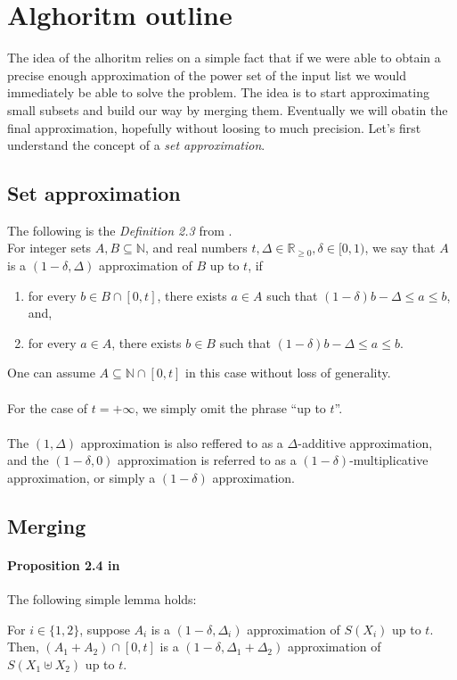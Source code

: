 \section{Alghoritm outline}
The idea of the alhoritm relies on a simple fact that if we were able to obtain a precise enough approximation of the power set of the input list we would immediately be able to solve the \Partition problem. The idea is to start approximating small subsets and build our way by merging them. Eventually we will obatin the final approximation, hopefully without loosing to much precision. Let's first understand the concept of a \textit{set approximation}.
\subsection{Set approximation}
The following is the \textit{Definition 2.3} from \cite{deng}. \\
For integer sets \(A, B \subseteq \mathbb{N}\), and real numbers \(t, \Delta \in \mathbb{R}_{\geq 0}, \delta \in [0, 1)\), we say that \(A\) is a \((1 - \delta, \Delta)\) approximation of \(B\) up to \(t\), if
\begin{enumerate}
    \item for every \(b \in B \cap [0, t]\), there exists \(a \in A\) such that \((1 - \delta)b - \Delta \leq a \leq b\), and,
    \item for every \(a \in A\), there exists \(b \in B\) such that \((1 - \delta)b - \Delta \leq a \leq b\).
\end{enumerate}
One can assume \(A \subseteq \mathbb{N} \cap [0, t]\) in this case without loss of generality.
\\ \\
For the case of \(t = +\infty\), we simply omit the phrase “up to \(t\)”.
\\ \\
The \((1, \Delta)\) approximation is also reffered to as a \(\Delta\)-additive approximation, and the \((1 - \delta, 0)\) approximation is referred to as a \((1 - \delta)\)-multiplicative approximation, or simply a \((1 - \delta)\) approximation.\\

\subsection{Merging}

\paragraph{Proposition 2.4 in \cite{deng}} 
The following simple lemma holds:

For \(i \in \{1, 2\}\), suppose \(A_i\) is a \((1 - \delta, \Delta_i)\) approximation of \(S(X_i)\) up to \(t\). Then, \((A_1 + A_2) \cap [0, t]\) is a \((1 - \delta, \Delta_1 + \Delta_2)\) approximation of \(S(X_1 \uplus X_2)\) up to \(t\).
